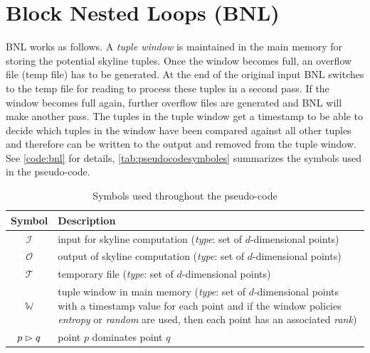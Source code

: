 \vfill
\pagebreak[4]

\section{Block Nested Loops (BNL)}
BNL \citep{Borzsonyi2001} works as follows.  A {\em tuple window} is
maintained in the main memory for storing the potential skyline
tuples.  Once the window becomes full, an overflow file (temp file)
has to be generated.  At the end of the original input BNL switches to
the temp file for reading to process these tuples in a second pass.
If the window becomes full again, further overflow files are generated
and BNL will make another pass.  The tuples in the tuple window get a
timestamp to be able to decide which tuples in the window have been
compared against all other tuples and therefore can be written to the
output and removed from the tuple window. See \autoref{code:bnl} for
details, \autoref{tab:pseudocodesymboles} summarizes the symbols used
in the pseudo-code. 





\begin{table}[htbp]
\centering
\begin{tabular}{cp{100mm}}
Symbol & Description \\
\hline
$\mathcal{I}$ & input for skyline computation (\emph{type}: set of $d$-dimensional points) \\
$\mathcal{O}$ & output of skyline computation (\emph{type}: set of $d$-dimensional points) \\
$\mathcal{T}$ & temporary file (\emph{type}: set of $d$-dimensional points) \\
$\mathbb{W}$ & tuple window in main memory (\emph{type}: set of $d$-dimensional points with a timestamp value for each point and if the window policies \emph{entropy} or \emph{random} are used, then each point has an associated \emph{rank}) \\
$p \vartriangleright q$ & point $p$ dominates point $q$
\end{tabular}
\caption{Symbols used throughout the pseudo-code}
\label{tab:pseudocodesymboles}
\end{table}


